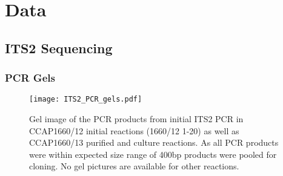 \graphicspath{{appendices/appendix_1/figures/}}
\chapter{Data}

\section{ITS2 Sequencing}
\label{sec:app_its2}

\subsection{PCR Gels}
\begin{figure}[H]
    \centering
    \texttt{[image: ITS2\_PCR\_gels.pdf]}
    \caption[Gel images of ITS2 PCR from CCAP1660/12 and CCAP1660/13 reactions]{
        Gel image of the PCR products from initial ITS2 PCR in CCAP1660/12 initial reactions (1660/12 1-20) 
as well as CCAP1660/13 purified and culture reactions. As all PCR products were within expected
size range of 400bp products were pooled for cloning. No gel pictures are available for other reactions.} 
\label{fig:endo_annot}
\end{figure}

